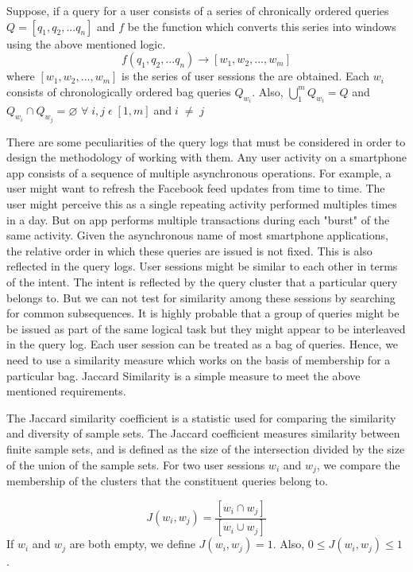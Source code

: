 Suppose, if a query for a user consists of a series of chronically ordered queries $Q = [q_1,q_2,...q_n]$ and $f$ be the function which converts this series into windows using the above mentioned logic.
$$f(q_1,q_2,...q_n) \rightarrow [w_1,w_2,...,w_m]$$
where $[w_1,w_2,...,w_m]$ is the series of user sessions the are obtained. Each $w_i$ consists of chronologically ordered bag queries $Q_{w_i}$. Also, $\bigcup_1^m Q_{w_i} = Q$ and $Q_{w_i} \cap Q_{w_j}=\varnothing$ $\forall\;i,j\;\epsilon\;[1,m]\;$and$\;i\;\neq\;j$

There are some peculiarities of the query logs that must be considered in order to design the methodology of working with them. Any user activity on a smartphone app consists of a sequence of multiple asynchronous operations. For example, a user might want to refresh the Facebook feed updates from time to time. The user might perceive this as a single repeating activity performed multiples times in a day. But on app performs multiple transactions during each "burst" of the same activity. Given the asynchronous name of most smartphone applications, the relative order in which these queries are issued is not fixed. This is also reflected in the query logs. User sessions might be similar to each other in terms of the intent. The intent is reflected by the query cluster that a particular query belongs to. But we can not test for similarity among these sessions by searching for common subsequences. It is highly probable that a group of queries might be be issued as part of the same logical task but they might appear to be interleaved in the query log. Each user session can be treated as a bag of queries. Hence, we need to use a similarity measure which works on the basis of membership for a particular bag. Jaccard Similarity is a simple measure to meet the above mentioned requirements. 

The Jaccard similarity coefficient is a statistic used for comparing the similarity and diversity of sample sets. The Jaccard coefficient measures similarity between finite sample sets, and is defined as the size of the intersection divided by the size of the union of the sample sets. For two user sessions $w_i$ and $w_j$, we compare the membership of the clusters that the constituent queries belong to.

$$J(w_i,w_j) = \frac{\left[w_i\cap w_j\right]}{\left[w_i\cup w_j\right]}$$
If $w_i$ and $w_j$ are both empty, we define $J(w_i,w_j) = 1$. Also,  $0\leq J(w_i,w_j) \leq 1$ .


